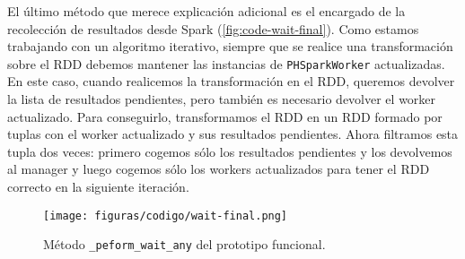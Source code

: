 El último método que merece explicación adicional es el encargado de la recolección de resultados desde Spark (\autoref{fig:code-wait-final}). Como estamos trabajando con un algoritmo iterativo, siempre que se realice una transformación sobre el RDD debemos mantener las instancias de \texttt{PHSparkWorker} actualizadas. En este caso, cuando realicemos la transformación en el RDD, queremos devolver la lista de resultados pendientes, pero también es necesario devolver el worker actualizado. Para conseguirlo, transformamos el RDD en un RDD formado por tuplas con el worker actualizado y sus resultados pendientes. Ahora filtramos esta tupla dos veces: primero cogemos sólo los resultados pendientes y los devolvemos al manager y luego cogemos sólo los workers actualizados para tener el RDD correcto en la siguiente iteración.

\begin{figure}[H]
    \centerline{\texttt{[image: figuras/codigo/wait-final.png]}}
    \caption{Método \texttt{\_peform\_wait\_any} del prototipo funcional.}
    \label{fig:code-wait-final}
\end{figure}